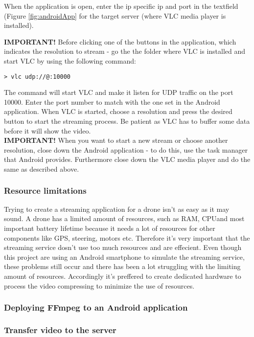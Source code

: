 
When the application is open, enter the ip specific ip and port in the textfield (Figure \ref{fig:androidApp} for the target server (where VLC media player is installed).


\textbf{IMPORTANT!} Before clicking one of the buttons in the application, which indicates the resolution to stream - go the the folder where VLC is installed and start VLC by using the following command:

\begin{verbatim}
> vlc udp://@:10000
\end{verbatim}

The command will start VLC and make it listen for UDP traffic on the port 10000. Enter the port number to match with the one set in the Android application.
When VLC is started, choose a resolution and press the desired button to start the streaming process. Be patient as VLC has to buffer some data before it will show the video.\\

\textbf{IMPORTANT!} When you want to start a new stream or choose another resolution, close down the Android application - to do this, use the task manager that Android provides. Furthermore close down the VLC media player and do the same as described above.

\subsubsection{Resource limitations}
Trying to create a streaming application for a drone isn't as easy as it may sound. A drone has a limited amount of resources, such as RAM, CPUand most important battery lifetime because it needs a lot of resources for other components like GPS, steering, motors etc. Therefore it's very important that the streaming service dosn't use too much resources and are effecient. Even though this project are using an Android smartphone to simulate the streaming service, these problems still occur and there has been a lot struggling with the limiting amount of resources. Accordingly it's preffered to create dedicated hardware to process the video compressing to minimize the use of resources.

\subsubsection{Deploying FFmpeg to an Android application}

\subsubsection{Transfer video to the server}
